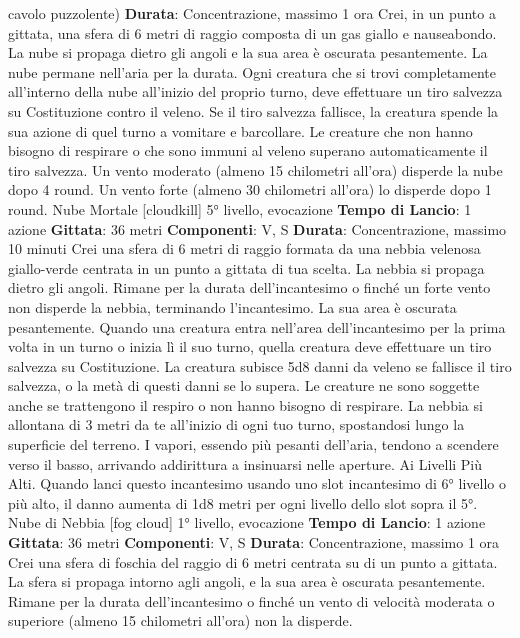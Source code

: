\begin{multicols}{2}
cavolo puzzolente)
\textbf{Durata}: Concentrazione, massimo 1 ora
Crei, in un punto a gittata, una sfera di 6 metri di raggio
composta di un gas giallo e nauseabondo. La nube si
propaga dietro gli angoli e la sua area è oscurata
pesantemente. La nube permane nell’aria per la durata.
Ogni creatura che si trovi completamente all’interno
della nube all’inizio del proprio turno, deve effettuare un
tiro salvezza su Costituzione contro il veleno. Se il tiro
salvezza fallisce, la creatura spende la sua azione di
quel turno a vomitare e barcollare. Le creature che non
hanno bisogno di respirare o che sono immuni al veleno
superano automaticamente il tiro salvezza.
Un vento moderato (almeno 15 chilometri all’ora)
disperde la nube dopo 4 round. Un vento forte (almeno
30 chilometri all’ora) lo disperde dopo 1 round.
Nube Mortale
[cloudkill]
5° livello, evocazione
\textbf{Tempo di Lancio}: 1 azione
\textbf{Gittata}: 36 metri
\textbf{Componenti}: V, S
\textbf{Durata}: Concentrazione, massimo 10 minuti
Crei una sfera di 6 metri di raggio formata da una
nebbia velenosa giallo-verde centrata in un punto a
gittata di tua scelta. La nebbia si propaga dietro gli
angoli. Rimane per la durata dell’incantesimo o finché
un forte vento non disperde la nebbia, terminando
l’incantesimo. La sua area è oscurata pesantemente.
Quando una creatura entra nell’area dell’incantesimo
per la prima volta in un turno o inizia lì il suo turno,
quella creatura deve effettuare un tiro salvezza su
Costituzione. La creatura subisce 5d8 danni da veleno
se fallisce il tiro salvezza, o la metà di questi danni se lo
supera. Le creature ne sono soggette anche se
trattengono il respiro o non hanno bisogno di respirare.
La nebbia si allontana di 3 metri da te all’inizio di ogni
tuo turno, spostandosi lungo la superficie del terreno. I
vapori, essendo più pesanti dell’aria, tendono a
scendere verso il basso, arrivando addirittura a
insinuarsi nelle aperture.
Ai Livelli Più Alti. Quando lanci questo incantesimo
usando uno slot incantesimo di 6° livello o più alto, il
danno aumenta di 1d8 metri per ogni livello dello slot
sopra il 5°.
Nube di Nebbia
[fog cloud]
1° livello, evocazione
\textbf{Tempo di Lancio}: 1 azione
\textbf{Gittata}: 36 metri
\textbf{Componenti}: V, S
\textbf{Durata}: Concentrazione, massimo 1 ora
Crei una sfera di foschia del raggio di 6 metri centrata
su di un punto a gittata. La sfera si propaga intorno agli
angoli, e la sua area è oscurata pesantemente. Rimane
per la durata dell’incantesimo o finché un vento di
velocità moderata o superiore (almeno 15 chilometri
all’ora) non la disperde.

\end{multicols}
